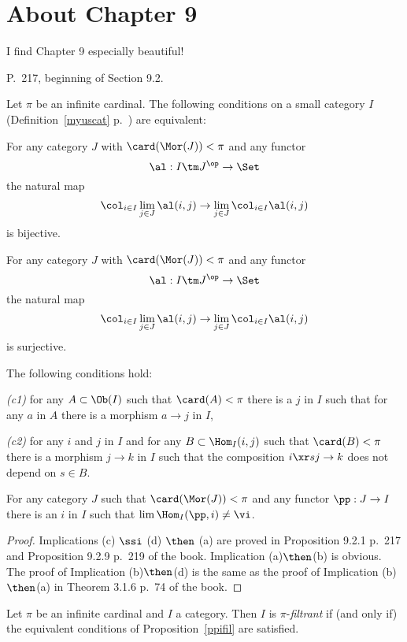 \documentclass[12pt]{article}
\theoremstyle{remark}
\theoremstyle{definition}
\begin{document}

\section{About Chapter 9}

I find Chapter 9 especially beautiful!


\begin{s}
P.~217, beginning of Section 9.2. 

\begin{prop}
Let $\pi$ be an infinite cardinal. The following conditions on a small category $I$ (Definition~\ref{myuscat} p.~) are equivalent:

 For any category $J$ with $\card(\Mor(J))<\pi$ and any functor 
$$
\al:I\tm J^{\op}\to\Set
$$ 
the natural map 
$$
\col_{i\in I}\lim_{j\in J}\al(i,j)\to\lim_{j\in J}\col_{i\in I}\al(i,j)
$$ 
is bijective.

 For any category $J$ with $\card(\Mor(J))<\pi$ and any functor 
$$
\al:I\tm J^{\op}\to\Set
$$ 
the natural map 
$$
\col_{i\in I}\lim_{j\in J}\al(i,j)\to\lim_{j\in J}\col_{i\in I}\al(i,j)
$$ 
is surjective.

 The following conditions hold:

{\em(c1)} for any $A\subset\Ob(I)$ such that $\card(A)<\pi$ there is a $j$ in $I$ such that for any $a$ in $A$ there is a morphism $a\to j$ in $I$,

{\em(c2)} for any $i$ and $j$ in $I$ and for any $B\subset\Hom_I(i,j)$ such that $\card(B)<\pi$ there is a morphism $j\to k$ in $I$ such that the composition $i\xr sj\to k$ does not depend on $s\in B$.

 For any category $J$ such that $\card(\Mor(J))<\pi$ and any functor $\pp:J\to I$ there is an $i$ in $I$ such that $\lim\Hom_I(\pp,i)\neq\vi$. 
\end{prop}

\begin{proof}
Implications (c) $\ssi$ (d) $\then$ (a) are proved in Proposition 9.2.1 p.~217 and Proposition 9.2.9 p.~219 of the book. Implication (a)$\then$(b) is obvious. The proof of Implication (b)$\then$(d) is the same as the proof of Implication (b)$\then$(a) in Theorem 3.1.6 p.~74 of the book.
\end{proof}

\begin{df} 
Let $\pi$ be an infinite cardinal and $I$ a category. Then $I$ is $\pi$-{\em filtrant} if (and only if) the equivalent conditions of Proposition~\ref{ppifil} are satisfied.
\end{df}
\end{s}
\end{document}
